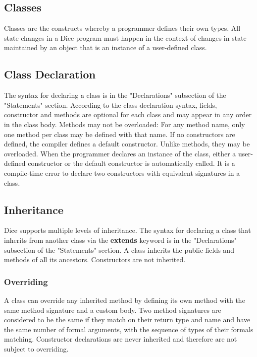 \begin{homeworkProblem}
	\section{Classes}
	
	Classes are the constructs whereby a programmer defines their own types. All state changes in a Dice program must happen in the context of changes in state maintained by an object that is an instance of a user-defined class.
	
	\subsection{Class Declaration}
	The syntax for declaring a class is in the "Declarations" subsection of the "Statements" section. According to the class declaration syntax, fields, constructor and methods are optional for each class and may appear in any order in the class body. 
	\newline
	Methods may not be overloaded: For any method name, only one method per class may be defined with that name.
	\newline
	If no constructors are defined, the compiler defines a default constructor. Unlike methods, they may be overloaded. When the programmer declares an instance of the class, either a user-defined constructor or the default constructor is automatically called. It is a compile-time error to declare two constructors with equivalent signatures in a class.
	
	\subsection{Inheritance}
	Dice supports multiple levels of inheritance. The syntax for declaring a class that inherits from another class via the \textbf{extends} keyword is in the "Declarations" subsection of the "Statements" section. A class inherits the public fields and methods of all its ancestors. Constructors are not inherited.
	
	\subsubsection{Overriding}
	A class can override any inherited method by defining its own method with the same method signature and a custom body. Two method signatures are considered to be the same if they match on their return type and name and have the same number of formal arguments, with the sequence of types of their formals matching. Constructor declarations are never inherited and therefore are not subject to overriding.
	

\end{homeworkProblem}
